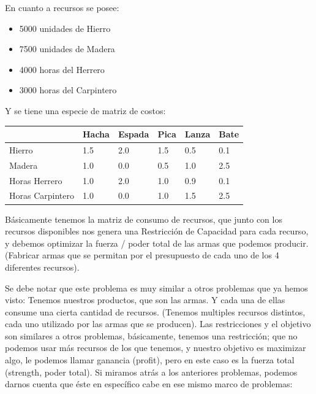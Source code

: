 \documentclass[12pt]{article}
\begin{document}
\begin{justify}
En cuanto a recursos se posee:
\end{justify}

\begin{itemize}
\item 5000 unidades de Hierro
\item 7500 unidades de Madera
\item 4000 horas del Herrero
\item 3000 horas del Carpintero
\end{itemize}

\newpage

\begin{justify}
Y se tiene una especie de matriz de costos:
\end{justify}

\begin{table}[h]
\begin{tabular}{|l|l|l|l|l|l|}
\hline
                 & Hacha & Espada & Pica & Lanza & Bate \\ \hline
Hierro           & 1.5   & 2.0    & 1.5  & 0.5   & 0.1  \\ \hline
Madera           & 1.0   & 0.0    & 0.5  & 1.0   & 2.5  \\ \hline
Horas Herrero    & 1.0   & 2.0    & 1.0  & 0.9   & 0.1  \\ \hline
Horas Carpintero & 1.0   & 0.0    & 1.0  & 1.5   & 2.5  \\ \hline
\end{tabular}
\end{table}

\begin{justify}
Básicamente tenemos la matriz de consumo de recursos, que junto con los recursos disponibles nos genera una Restricción de Capacidad para cada recurso, y debemos optimizar la fuerza / poder total de las armas que podemos producir. (Fabricar armas que se permitan por el presupuesto de cada uno de los 4 diferentes recursos).
\end{justify}

\begin{justify}
Se debe notar que este problema es muy similar a otros problemas que ya hemos visto: Tenemos nuestros productos, que son las armas. Y cada una de ellas consume una cierta cantidad de recursos. (Tenemos multiples recursos distintos, cada uno utilizado por las armas que se producen). Las restricciones y el objetivo son similares a otros problemas, básicamente, tenemos una restricción; que no podemos usar más recursos de los que tenemos, y nuestro objetivo es maximizar algo, le podemos llamar ganancia (profit), pero en este caso es la fuerza total (strength, poder total). Si miramos atrás a los anteriores problemas, podemos darnos cuenta que éste en específico cabe en ese mismo marco de problemas:
\end{justify}
\end{document}
